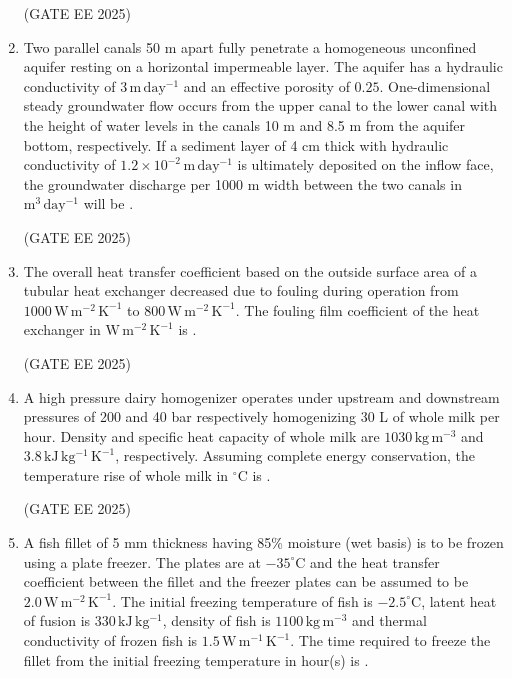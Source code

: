 \documentclass[journal,12pt,onecolumn]{IEEEtran}
\theoremstyle{remark}
\begin{document}
\begin{enumerate}
\hfill(GATE EE 2025)

\item Two parallel canals 50 m apart fully penetrate a homogeneous unconfined aquifer resting on a horizontal impermeable layer. The aquifer has a hydraulic conductivity of $3\,\mathrm{m\,day^{-1}}$ and an effective porosity of $0.25$. One-dimensional steady groundwater flow occurs from the upper canal to the lower canal with the height of water levels in the canals 10 m and 8.5 m from the aquifer bottom, respectively. If a sediment layer of 4 cm thick with hydraulic conductivity of $1.2\times10^{-2}\,\mathrm{m\,day^{-1}}$ is ultimately deposited on the inflow face, the groundwater discharge per 1000 m width between the two canals in $\mathrm{m^{3}\,day^{-1}}$ will be \underline{\hspace{2.5cm}}. 

\hfill(GATE EE 2025)

\item The overall heat transfer coefficient based on the outside surface area of a tubular heat exchanger decreased due to fouling during operation from $1000\,\mathrm{W\,m^{-2}\,K^{-1}}$ to $800\,\mathrm{W\,m^{-2}\,K^{-1}}$. The fouling film coefficient of the heat exchanger in $\mathrm{W\,m^{-2}\,K^{-1}}$ is \underline{\hspace{2.5cm}}. 

\hfill(GATE EE 2025)

\item A high pressure dairy homogenizer operates under upstream and downstream pressures of 200 and 40 bar respectively homogenizing 30 L of whole milk per hour. Density and specific heat capacity of whole milk are $1030\,\mathrm{kg\,m^{-3}}$ and $3.8\,\mathrm{kJ\,kg^{-1}\,K^{-1}}$, respectively. Assuming complete energy conservation, the temperature rise of whole milk in $^{\circ}\mathrm{C}$ is \underline{\hspace{2.5cm}}.

\hfill(GATE EE 2025)

\item A fish fillet of 5 mm thickness having 85\% moisture (wet basis) is to be frozen using a plate freezer. The plates are at $-35^{\circ}\mathrm{C}$ and the heat transfer coefficient between the fillet and the freezer plates can be assumed to be $2.0\,\mathrm{W\,m^{-2}\,K^{-1}}$. The initial freezing temperature of fish is $-2.5^{\circ}\mathrm{C}$, latent heat of fusion is $330\,\mathrm{kJ\,kg^{-1}}$, density of fish is $1100\,\mathrm{kg\,m^{-3}}$ and thermal conductivity of frozen fish is $1.5\,\mathrm{W\,m^{-1}\,K^{-1}}$. The time required to freeze the fillet from the initial freezing temperature in hour(s) is \underline{\hspace{2.5cm}}.


\end{enumerate}
\end{document}
